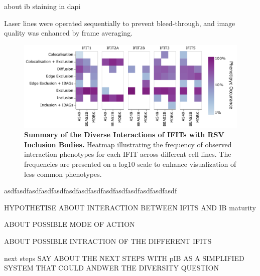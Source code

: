 about ib staining in dapi

Laser lines were operated sequentially to prevent bleed-through, and image quality was enhanced by frame averaging.

\cite{Jonkman2020Tutorial:Microscopy}

\begin{figure}
    \centering
    \includegraphics[width=1\linewidth]{08. Chapter 3/Figs/heatmap_infection.pdf}
    \caption[Summary of the Diverse Interactions of IFITs with RSV Inclusion Bodies.]{\textbf{Summary of the Diverse Interactions of IFITs with RSV Inclusion Bodies.} Heatmap illustrating the frequency of observed interaction phenotypes for each IFIT across different cell lines. The frequencies are presented on a log10 scale to enhance visualization of less common phenotypes.}
    \label{fig:Summary of the Diverse Interactions of IFITs with RSV Inclusion Bodies}
\end{figure}

asdfasdfasdfasdfasdfasdfasdfasdfasdfasdfasdfasdfasdfasdf

HYPOTHETISE ABOUT INTERACTION BETWEEN IFITS AND IB maturity

ABOUT POSSIBLE MODE OF ACTION

ABOUT POSSIBLE INTRACTION OF THE DIFFERENT IFITS


next steps
SAY ABOUT THE NEXT STEPS WITH pIB AS A SIMPLIFIED SYSTEM THAT COULD ANDWER THE DIVERSITY QUESTION




